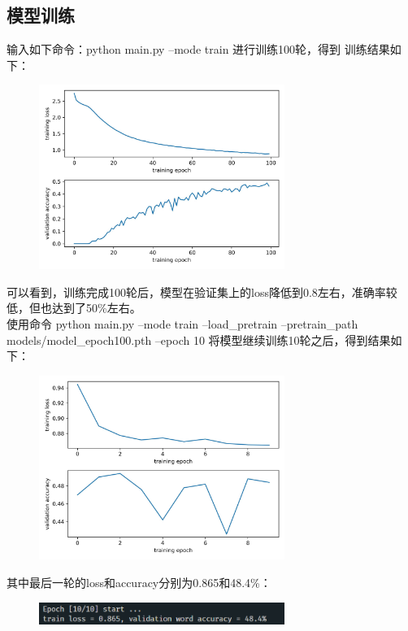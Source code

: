 \documentclass[a4paper]{article}
\begin{document}
\subsection{模型训练}
\hspace{2em}输入如下命令：python main.py –mode train 进行训练100轮，得到
训练结果如下：\\
\begin{figure}[H]
    \centering
    \includegraphics[width=8cm]{loss_and_accuracy_100.jpg}
\end{figure}
\hspace{2em}可以看到，训练完成100轮后，模型在验证集上的loss降低到0.8左右，准确率较低，但也达到了50\%左右。\\
\hspace{2em}使用命令 python main.py --mode train --load\_pretrain --pretrain\_path models/model\_epoch100.pth --epoch 10 将模型继续训练10轮之后，得到结果如下：\\
\begin{figure}[H]
    \centering
    \includegraphics[width=8cm]{loss_and_accuracy.jpg}
\end{figure}
\hspace{2em}其中最后一轮的loss和accuracy分别为0.865和48.4\%：
\begin{figure}[H]
    \centering
    \includegraphics[width=8cm]{2.png}
\end{figure}
\end{document}
